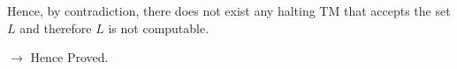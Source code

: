 \documentclass[12pt,a4paper]{article}
\begin{document}
Hence, by contradiction, there does not exist any halting TM that accepts the set $L$ and therefore $L$ is not computable.

$\rightarrow$ Hence Proved.















%
% 
\end{document}

